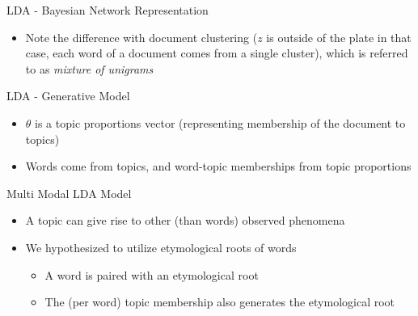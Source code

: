 \documentclass[pdf]{beamer}
\begin{document}
\begin{frame}{LDA - Bayesian Network Representation}
	\hspace{5cm}
	\begin{itemize}
		\item Note the difference with document clustering ($z$ is outside of the plate in that case, each word of a document comes from a single cluster), which is referred to as \textit{mixture of unigrams}
	\end{itemize}
\end{frame}

\begin{frame}{LDA - Generative Model}
	\begin{itemize}
		\item $\theta$ is a topic proportions vector (representing membership of the document to topics)
		\item Words come from topics, and word-topic memberships from topic proportions
	\end{itemize}
\end{frame}


\begin{frame}{Multi Modal LDA Model}
	\begin{itemize}
		\item A topic can give rise to other (than words) observed phenomena
		\item We hypothesized to utilize etymological roots of words
		\begin{itemize}
			\item A word is paired with an etymological root
			\item The (per word) topic membership also generates the etymological root
		\end{itemize}
	\end{itemize}
\end{frame}
\end{document}
